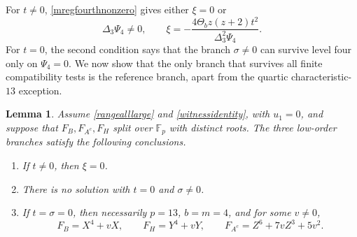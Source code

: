 \documentclass[12pt]{article}
\newtheorem{lemma}{Lemma}[section]
\theoremstyle{remark}
\newcommand{\F}{\mathbb{F}_p}
\begin{document}
For $t\ne0$, \eqref{mregfourthnonzero} gives either $\xi=0$ or
\begin{equation}\label{mregxicandidate}
 \Delta_3\Psi_4\ne0,
 \qquad
 \xi=-\frac{4\Theta_bz(z+2)t^2}{\Delta_3^2\Psi_4}.
\end{equation}
For $t=0$, the second condition says that the branch $\sigma\ne0$
can survive level four only on $\Psi_4=0$.  We now show that the only
branch that survives all finite compatibility tests is the reference
branch, apart from the quartic characteristic-$13$ exception.

\begin{lemma}\label{branchscreening}
Assume \eqref{rangealllarge} and \eqref{witnessidentity}, with
$u_1=0$, and suppose that $F_B,F_{A^c},F_H$ split over $\F$ with
distinct roots.  The three low-order branches satisfy the following conclusions.
\begin{enumerate}[label=\textup{(\roman*)},nosep]
\item If $t\ne0$, then $\xi=0$.
\item There is no solution with $t=0$ and $\sigma\ne0$.
\item If $t=\sigma=0$, then necessarily $p=13$, $b=m=4$, and for some
$v\ne0$,
\begin{equation}\label{quartictriple}
 F_B=X^4+vX,\qquad F_H=Y^4+vY,\qquad
 F_{A^c}=Z^6+7vZ^3+5v^2.
\end{equation}
\end{enumerate}
\end{lemma}
\end{document}
